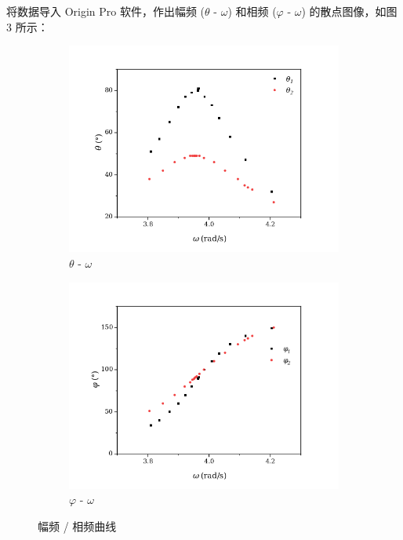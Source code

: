 \documentclass{THUexprep}
\begin{document}
将数据导入 Origin Pro 软件，作出幅频 ($\theta$ - $\omega$) 和相频 ($\varphi$ - $\omega$) 的散点图像，如图 3 所示：

\begin{figure}[h]
    \begin{subfigure}[b]{0.45\textwidth}
        \includegraphics[scale=0.4]{fupin.png}
        \caption{\(\mathit{\theta}\) - \(\mathit{\omega}\)}
        \label{fig:side:a}
    \end{subfigure}
    \begin{subfigure}[b]{0.45\textwidth}
        \includegraphics[scale=0.4]{xiangpin.png}
        \caption{\(\mathit{\varphi}\) - \(\mathit{\omega}\)}
        \label{fig:side:b}
    \end{subfigure}
    \caption{幅频 / 相频曲线}
\end{figure}
\end{document}
